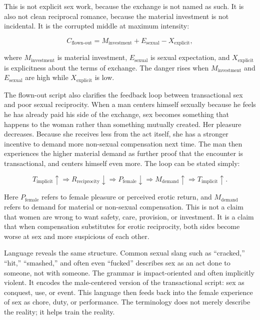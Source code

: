 \documentclass[12pt]{article}
\begin{document}
This is not explicit sex work, because the exchange is not named as such. It is also not clean reciprocal romance, because the material investment is not incidental. It is the corrupted middle at maximum intensity:

\begin{equation}
  C_{\text{flown-out}} =
  M_{\text{investment}} +
  E_{\text{sexual}} -
  X_{\text{explicit}},
\end{equation}

where $M_{\text{investment}}$ is material investment, $E_{\text{sexual}}$ is sexual expectation, and $X_{\text{explicit}}$ is explicitness about the terms of exchange. The danger rises when $M_{\text{investment}}$ and $E_{\text{sexual}}$ are high while $X_{\text{explicit}}$ is low.

The flown-out script also clarifies the feedback loop between transactional sex and poor sexual reciprocity. When a man centers himself sexually because he feels he has already paid his side of the exchange, sex becomes something that happens to the woman rather than something mutually created. Her pleasure decreases. Because she receives less from the act itself, she has a stronger incentive to demand more non-sexual compensation next time. The man then experiences the higher material demand as further proof that the encounter is transactional, and centers himself even more. The loop can be stated simply:

\begin{equation}
  T_{\text{implicit}} \uparrow
  \Rightarrow
  R_{\text{reciprocity}} \downarrow
  \Rightarrow
  P_{\text{female}} \downarrow
  \Rightarrow
  M_{\text{demand}} \uparrow
  \Rightarrow
  T_{\text{implicit}} \uparrow.
\end{equation}

Here $P_{\text{female}}$ refers to female pleasure or perceived erotic return, and $M_{\text{demand}}$ refers to demand for material or non-sexual compensation. This is not a claim that women are wrong to want safety, care, provision, or investment. It is a claim that when compensation substitutes for erotic reciprocity, both sides become worse at sex and more suspicious of each other.

Language reveals the same structure. Common sexual slang such as ``cracked,'' ``hit,'' ``smashed,'' and often even ``fucked'' describes sex as an act done to someone, not with someone. The grammar is impact-oriented and often implicitly violent. It encodes the male-centered version of the transactional script: sex as conquest, use, or event. This language then feeds back into the female experience of sex as chore, duty, or performance. The terminology does not merely describe the reality; it helps train the reality.
\end{document}
